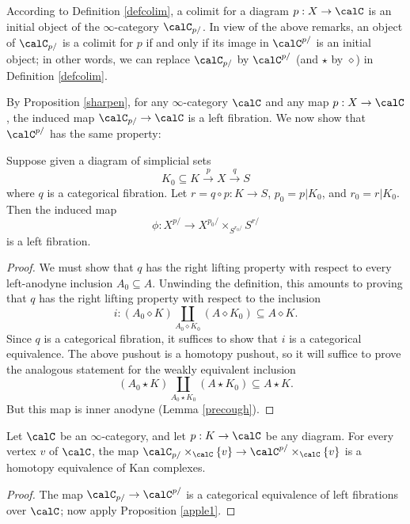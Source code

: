 According to Definition \ref{defcolim}, a colimit for a diagram $p: X \rightarrow \calC$ is an initial object of the $\infty$-category $\calC_{p/}$. In view of the above remarks, an object of $\calC_{p/}$ is a colimit for $p$ if and only if its image in $\calC^{p/}$ is an initial object; in other words, we can replace $\calC_{p/}$ by $\calC^{p/}$ (and $\star$ by $\diamond$) in Definition \ref{defcolim}.

By Proposition \ref{sharpen}, for any $\infty$-category $\calC$ and any
map $p: X \rightarrow \calC$, the induced map $\calC_{p/} \rightarrow \calC$
is a left fibration. We now show that $\calC^{p/}$ has the same
property:

\begin{proposition}\label{sharpenn}
Suppose given a diagram of simplicial sets
$$ K_0 \subseteq K \stackrel{p}{\rightarrow} X \stackrel{q}{\rightarrow} S$$
where $q$ is a categorical fibration. Let $r = q \circ p: K \rightarrow S$,
$p_0 = p|K_0$, and $r_0 = r|K_0$. Then the induced map
$$ \phi: X^{p/} \rightarrow X^{p_0/} \times_{ S^{r_0/} } S^{r/}$$
is a left fibration.
\end{proposition}

\begin{proof}
We must show that $q$ has the right lifting property with respect to every left-anodyne inclusion
$A_0 \subseteq A$. Unwinding the definition, this amounts to proving that $q$ has the right
lifting property with respect to the inclusion
$$ i: (A_0 \diamond K) \coprod_{ A_0 \diamond K_0} (A \diamond K_0) \subseteq
A \diamond K.$$
Since $q$ is a categorical fibration, it suffices to show that $i$ is a categorical equivalence.
The above pushout is a homotopy pushout, so it will suffice to prove the analogous statement for the weakly equivalent inclusion
$$ (A_0 \star K) \coprod_{ A_0 \star K_0 } (A \star K_0) \subseteq A \star K.$$
But this map is inner anodyne (Lemma \ref{precough}).
\end{proof}

\begin{corollary}\label{measles}
Let $\calC$ be an $\infty$-category, and let $p: K \rightarrow \calC$ be any
diagram. For every vertex $v$ of $\calC$, the map $\calC_{p/} \times_{\calC}
\{v\} \rightarrow \calC^{p/} \times_{\calC} \{v\}$ is a homotopy
equivalence of Kan complexes.
\end{corollary}

\begin{proof}
The map $\calC_{p/} \rightarrow \calC^{p/}$ is a categorical equivalence
of left fibrations over $\calC$; now apply Proposition
\ref{apple1}.
\end{proof}

